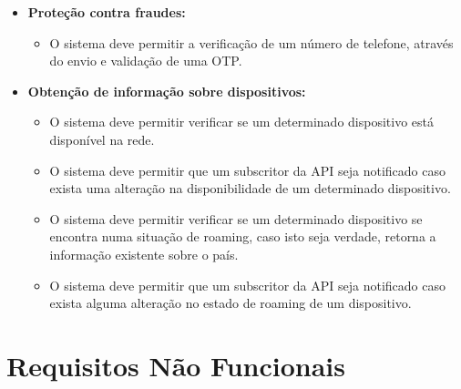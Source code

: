\begin{itemize}
	\item \textbf{Proteção contra fraudes:} \begin{itemize} \item O sistema
		            deve permitir a verificação de um número de telefone, através do envio e
		            validação de uma OTP. \end{itemize}

	\item \textbf{Obtenção de informação sobre dispositivos:} \begin{itemize}

		      \item O sistema deve permitir verificar se um determinado dispositivo está
		            disponível na rede. \item O sistema deve permitir que um subscritor da
		            API seja notificado caso exista uma alteração na disponibilidade de um
		            determinado dispositivo. \item O sistema deve permitir verificar se um
		            determinado dispositivo se encontra numa situação de roaming, caso isto
		            seja verdade, retorna a informação existente sobre o país. \item O
		            sistema deve permitir que um subscritor da API seja notificado caso
		            exista alguma alteração no estado de roaming de um dispositivo.
	      \end{itemize} \end{itemize}

\section{Requisitos Não Funcionais}

